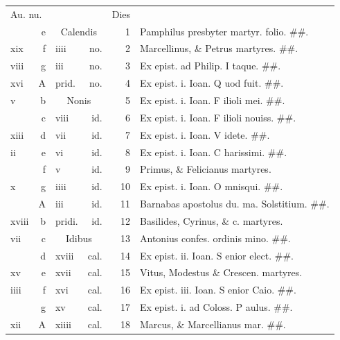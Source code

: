 \documentclass[a5paper,10pt]{book}
\begin{document}
\begin{center}
\begin{tabular}{l r l r r l}
\multicolumn{2}{l}{\color{red}Au. nu.} & & & \color{red} Dies & \\
 & e & \multicolumn{2}{c}{\color{red} Calendis} & 1 & Pamphilus presbyter martyr. \color{black} folio. \#\#.\\
xix & f & iiii & no. & 2 & Marcellinus, \& Petrus martyres. \color{black} \#\#.\\
viii & g & iii & no. & 3 & Ex epist. ad Philip. \color{red} I\color{black} taque. \#\#.\\
xvi & \color{red} A & \color{red} prid. & \color{red} no. & 4 & Ex epist. i. Ioan. \color{red} Q\color{black} uod fuit. \#\#.\\
v & b & \multicolumn{2}{c}{\color{red} Nonis} & 5 & Ex epist. i. Ioan. \color{red} F\color{black} ilioli mei. \#\#.\\
 & c & viii & id. & 6 & Ex epist. i. Ioan. \color{red} F\color{black} ilioli nouiss. \#\#.\\
xiii & d & vii & id. & 7 & Ex epist. i. Ioan. \color{red} V\color{black} idete. \#\#.\\
ii & e & vi & id. & 8 & Ex epist. i. Ioan. \color{red} C\color{black} harissimi. \#\#.\\
 & f & v & id. & 9 & Primus, \& Felicianus martyres. \\
x & g & iiii & id. & 10 & Ex epist. i. Ioan. \color{red} O\color{black} mnisqui. \#\#.\\
 & \color{red} A & iii & id. & 11 & \color{red} Barnabas apostolus du. ma. Solstitium. \color{black} \#\#.\\
xviii & b & \color{red} pridi. & \color{red} id. & 12 & Basilides, Cyrinus, \& c. martyres. \color{black}\\
vii & c & \multicolumn{2}{c}{\color{red} Idibus} & 13 & Antonius confes. ordinis mino. \color{black} \#\#.\\
 & d & xviii & cal. & 14 & Ex epist. ii. Ioan. \color{red} S\color{black} enior elect. \#\#.\\
xv & e & xvii & cal. & 15 & Vitus, Modestus \& Crescen. martyres.\\
iiii & f & xvi & cal. & 16 & Ex epist. iii. Ioan. \color{red} S\color{black} enior Caio. \#\#.\\
 & g & xv & cal. & 17 & Ex epist. i. ad Coloss. \color{red} P\color{black} aulus. \#\#.\\
xii & \color{red} A & xiiii & cal. & 18 & Marcus, \& Marcellianus mar. \#\#.\\

\end{tabular}
\end{center}
\end{document}
